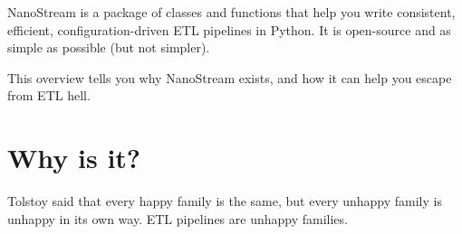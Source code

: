 \documentclass[letterpaper,10pt,english]{sphinxmanual}
\begin{document}
\begin{sphinxVerbatim}[commandchars=\\\{\}]
                 
                 
             
             
             
             
             
                 
                 
             
             
             
    \PYG{p}{]}
\end{sphinxVerbatim}

NanoStream is a package of classes and functions that help you write consistent, efficient, configuration-driven ETL pipelines in Python. It is open-source and
as simple as possible (but not simpler).

This overview tells you why NanoStream exists, and how it can help you escape from ETL hell.


\section{Why is it?}
\label{\detokenize{treehorn:why-is-it}}
Tolstoy said that every happy family is the same, but every unhappy family is
unhappy in its own way. ETL pipelines are unhappy families.
\end{document}
